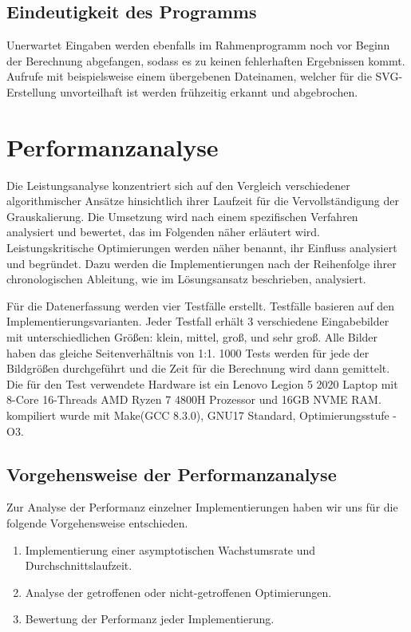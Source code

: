 \documentclass[course=asp]{aspdoc}
\begin{document}
\subsection{Eindeutigkeit des Programms}
Unerwartet Eingaben werden ebenfalls im Rahmenprogramm noch vor Beginn der Berechnung abgefangen, sodass es zu keinen fehlerhaften Ergebnissen kommt. Aufrufe mit beispielsweise einem übergebenen Dateinamen, welcher für die SVG-Erstellung unvorteilhaft ist werden frühzeitig erkannt und abgebrochen.


\section{Performanzanalyse}
Die Leistungsanalyse konzentriert sich auf den Vergleich verschiedener algorithmischer Ansätze hinsichtlich ihrer Laufzeit für die Vervollständigung der Grauskalierung. Die Umsetzung wird nach einem spezifischen Verfahren analysiert und bewertet, das im Folgenden näher erläutert wird. Leistungskritische Optimierungen werden näher benannt, ihr Einfluss analysiert und begründet. Dazu werden die Implementierungen nach der Reihenfolge ihrer chronologischen Ableitung, wie im Lösungsansatz beschrieben, analysiert.

Für die Datenerfassung werden vier Testfälle erstellt. Testfälle basieren auf den Implementierungsvarianten. Jeder Testfall erhält 3 verschiedene Eingabebilder mit unterschiedlichen Größen: klein, mittel, groß, und sehr groß. Alle Bilder haben das gleiche Seitenverhältnis von 1:1. 1000 Tests werden für jede der Bildgrößen durchgeführt und die Zeit für die Berechnung wird dann gemittelt. Die für den Test verwendete Hardware ist ein Lenovo Legion 5 2020 Laptop mit 8-Core 16-Threads AMD Ryzen 7 4800H Prozessor und 16GB NVME RAM. kompiliert wurde mit Make(GCC 8.3.0), GNU17 Standard, Optimierungsstufe -O3. 

\subsection{Vorgehensweise der Performanzanalyse}
Zur Analyse der Performanz einzelner Implementierungen haben wir uns für die folgende Vorgehensweise entschieden.

\begin{enumerate}
    \item Implementierung einer asymptotischen Wachstumsrate und Durchschnittslaufzeit.
    \item Analyse der getroffenen oder nicht-getroffenen Optimierungen.
    \item Bewertung der Performanz jeder Implementierung.
\end{enumerate}
\end{document}
